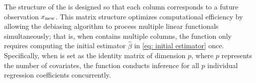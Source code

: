 \begin{Remark}
    The structure of the  is designed so that each column corresponds to a future observation $x_{\rm new}$. This matrix structure optimizes computational efficiency by allowing the debiasing algorithm to process multiple linear functionals simultaneously; that is, when  contains multiple columns, the  function only requires computing the initial estimator $\widehat{\beta}$ in \eqref{eq: initial estimator} once. Specifically, when  is set as the identity matrix of dimension $p$, where $p$ represents the number of covariates, the  function conducts inference for all $p$ individual regression coefficients concurrently.
\end{Remark}


